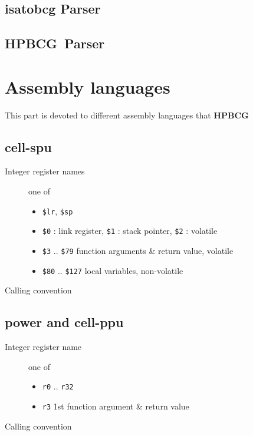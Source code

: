 \documentclass{article}
\newcommand{\hpbcg}{\textbf{HPBCG}\ }
\begin{document}
\subsection{isatobcg Parser}


\subsection{\hpbcg Parser}

\section{Assembly languages}

This part is devoted to different assembly languages that \hpbcg

\subsection{cell-spu}

\begin{description}
\item[Integer register names] one of
  \begin{itemize}
  \item \verb|$lr|, \verb|$sp|
  \item \verb|$0| : link register, \verb|$1| : stack pointer,
    \verb|$2| : volatile
  \item \verb|$3| .. \verb|$79| function arguments \& return value, volatile
  \item \verb|$80| .. \verb|$127| local variables, non-volatile
  \end{itemize}
\item[Calling convention] 
\end{description}

\subsection{power and cell-ppu }

\begin{description}
\item[Integer register name]  one of
  \begin{itemize}
  \item \verb|r0| .. \verb|r32|
  \item \verb|r3| 1st function argument \& return value
  \end{itemize}
\item[Calling convention] 
\end{description}
\end{document}
